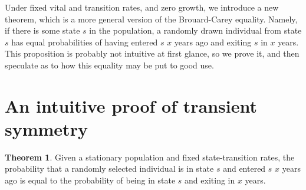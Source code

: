 \documentclass[12pt,oneside,a4paper]{article}
\theoremstyle{definition}
\newtheorem{theorem}{Theorem}[section]
\begin{document}
Under fixed vital and transition rates, and zero growth, we introduce a new
theorem, which is a more general version of the Brouard-Carey equality.
Namely, if there is some state $s$ in the population, a
randomly drawn individual from state $s$ has equal probabilities of having
entered $s$ $x$ years ago and exiting $s$ in $x$ years. This proposition
is probably not intuitive at first glance, so we prove it, and then speculate
as to how this equality may be put to good use.

\section{An intuitive proof of transient symmetry}
\FloatBarrier

\begin{theorem}
Given a stationary population and fixed state-transition
rates, the probability that a randomly selected individual is in state $s$ and entered $s$ $x$ years
ago is equal to the probability of being in state $s$ and exiting in $x$ years.
\end{theorem}
\end{document}
